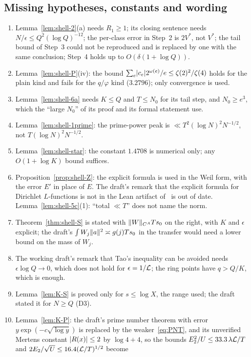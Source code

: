 \subsection{Missing hypotheses, constants and wording}
\begin{enumerate}
\item Lemma~\ref{lem:shell-2}(a) needs $R_1\ge1$; its closing sentence needs $N/\epsilon\le Q^2(\log Q)^{-12}$; the per-class error in Step~2 is $2V^*$, not $V^*$; the
tail bound of Step~3 could not be reproduced and is replaced by one with the same conclusion; Step~4 holds up to $O(\delta(1+\log Q))$.
\item Lemma~\ref{lem:shell-P}(iv): the bound $\sum_e\lvert c_e\rvert2^{\omega(e)}/e\le\zeta(2)^2/\zeta(4)$ holds for the plain kind and fails for the $q/\varphi$ kind ($3.2796$);
only convergence is used.
\item Lemma~\ref{lem:shell-6a} needs $K\le Q$ and $T\le N_0$ for its tail step, and $N_0\ge e^3$, which the ``large $N_0$'' of its proof and its
formal statement use.
\item Lemma~\ref{lem:shell-1prime}: the prime-power peak is $\ll T^2(\log N)^2N^{-1/2}$, not $T(\log N)^2N^{-1/2}$.
\item Lemma~\ref{lem:shell-star}: the constant $1.4708$ is numerical only; any $O(1+\log K)$ bound suffices.
\item Proposition~\ref{prop:shell-Z}: the explicit formula is used in the Weil form, with the error $E'$ in place of $E$. The draft's
remark that the explicit formula for Dirichlet $L$-functions is not in the Lean artifact of~\cite{AF} is out of date. Lemma~\ref{lem:shell-5c}(1): ``total
$\ll T$'' does not name the norm.
\item Theorem~\ref{thm:shell-S} is stated with $\lVert W\rVert_{C^A}Ts_0$ on the right, with $K$ and $\epsilon$ explicit; the draft's
$\int W_j\lVert a\rVert^2\asymp g(j)Ts_0$ in the transfer would need a lower bound on the mass of $W_j$.
\item The working draft's remark that Tao's inequality can be avoided needs $\epsilon\log Q\to0$, which does not hold for $\epsilon=1/\mathcal L$; the ring points
have $q>Q/K$, which is enough.
\item Lemma~\ref{lem:K-S} is proved only for $s\le\log X$, the range used; the draft stated it for $N\ge Q$ (D3).
\item Lemma~\ref{lem:K-P}: the draft's prime number theorem with error $y\exp(-c\sqrt{\log y})$ is replaced by the weaker~\eqref{eq:PNT}, and its unverified
Mertens constant $\lvert R(x)\rvert\le2$ by $\log4+4$, so the bounds $E_2^2/U\le33.3\,\lambda\mathcal L/T$ and $2E_2/\sqrt U\le16.4(\mathcal L/T)^{1/2}$ become

\end{enumerate}

